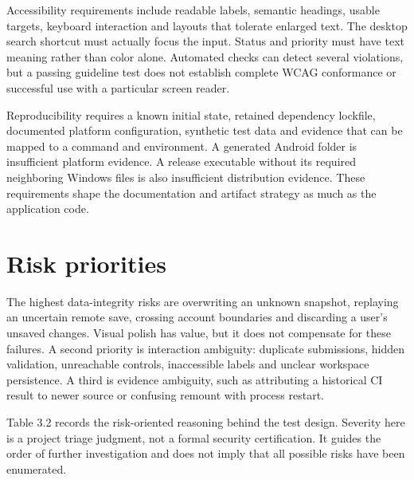 \documentclass[12pt,a4paper,oneside]{report}
\begin{document}
Accessibility requirements include readable labels, semantic headings, usable targets, keyboard interaction and layouts that tolerate enlarged text. The desktop search shortcut must actually focus the input. Status and priority must have text meaning rather than color alone. Automated checks can detect several violations, but a passing guideline test does not establish complete WCAG conformance or successful use with a particular screen reader.

Reproducibility requires a known initial state, retained dependency lockfile, documented platform configuration, synthetic test data and evidence that can be mapped to a command and environment. A generated Android folder is insufficient platform evidence. A release executable without its required neighboring Windows files is also insufficient distribution evidence. These requirements shape the documentation and artifact strategy as much as the application code.

\section{Risk priorities}
The highest data-integrity risks are overwriting an unknown snapshot, replaying an uncertain remote save, crossing account boundaries and discarding a user's unsaved changes. Visual polish has value, but it does not compensate for these failures. A second priority is interaction ambiguity: duplicate submissions, hidden validation, unreachable controls, inaccessible labels and unclear workspace persistence. A third is evidence ambiguity, such as attributing a historical CI result to newer source or confusing remount with process restart.

Table 3.2 records the risk-oriented reasoning behind the test design. Severity here is a project triage judgment, not a formal security certification. It guides the order of further investigation and does not imply that all possible risks have been enumerated.
\end{document}
